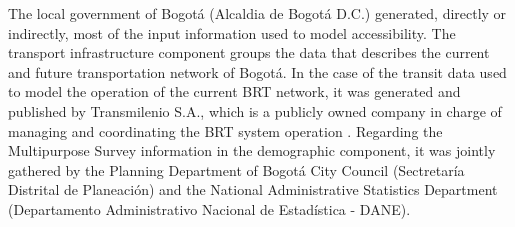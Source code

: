 \documentclass[12pt, a4paper]{report}
\begin{document}
\begin{table}[H]
\centering
\renewcommand{\arraystretch}{1.5} %
\caption{Input data summary.}
\label{tab:Data_summary}
\end{table}

The local government of Bogotá (Alcaldia de Bogotá D.C.) generated, directly or indirectly, most of the input information used to model accessibility. The transport infrastructure component groups the data that describes the current and future transportation network of Bogotá. In the case of the transit data used to model the operation of the current BRT network, it was generated and published by Transmilenio S.A., which is a publicly owned company in charge of managing and coordinating the BRT system operation \citep{transmilenios.a.HistoriaTransmilenioHistory2013}. Regarding the Multipurpose Survey information in the demographic component, it was jointly gathered by the Planning Department of Bogotá City Council (Sectretaría Distrital de Planeación) and the National Administrative Statistics Department (Departamento Administrativo Nacional de Estadística - DANE).
\end{document}
